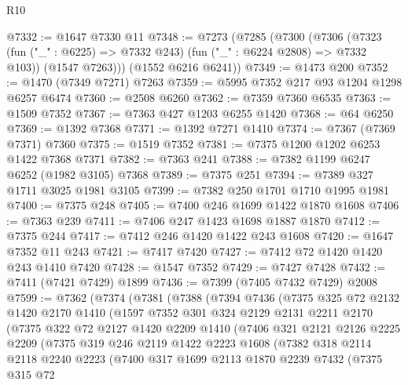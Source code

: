 \begin{lexlean}{R10}
\begin{coremodule}
@7332 := @1647 @7330 @11
@7348 := @7273
    (@7285
      (@7300
        (@7306
          (@7323 (fun ("_" : @6225) => @7332 @243) (fun ("_" : @6224 @2808) => @7332 @103))
          (@1547 @7263)))
      (@1552 @6216 @6241))
@7349 := @1473 @200
@7352 := @1470 (@7349 @7271) @7263
@7359 := @5995 @7352 @217 @93 @1204 @1298 @6257 @6474
@7360 := @2508 @6260
@7362 := @7359 @7360 @6535
@7363 := @1509 @7352
@7367 := @7363 @427 @1203 @6255 @1420
@7368 := @64 @6250
@7369 := @1392 @7368
@7371 := @1392 @7271 @1410
@7374 := @7367 (@7369 @7371) @7360
@7375 := @1519 @7352
@7381 := @7375 @1200 @1202 @6253 @1422 @7368 @7371
@7382 := @7363 @241
@7388 := @7382 @1199 @6247 @6252 (@1982 @3105) @7368
@7389 := @7375 @251
@7394 := @7389 @327 @1711 @3025 @1981 @3105
@7399 := @7382 @250 @1701 @1710 @1995 @1981
@7400 := @7375 @248
@7405 := @7400 @246 @1699 @1422 @1870 @1608
@7406 := @7363 @239
@7411 := @7406 @247 @1423 @1698 @1887 @1870
@7412 := @7375 @244
@7417 := @7412 @246 @1420 @1422 @243 @1608
@7420 := @1647 @7352 @11 @243
@7421 := @7417 @7420
@7427 := @7412 @72 @1420 @1420 @243 @1410 @7420
@7428 := @1547 @7352
@7429 := @7427 @7428
@7432 := @7411 (@7421 @7429) @1899
@7436 := @7399 (@7405 @7432 @7429) @2008
@7599 := @7362
    (@7374
      (@7381
        (@7388
          (@7394
            @7436
            (@7375
              @325
              @72
              @2132
              @1420
              @2170
              @1410
              (@1597
                @7352
                @301
                @324
                @2129
                @2131
                @2211
                @2170
                (@7375
                  @322
                  @72
                  @2127
                  @1420
                  @2209
                  @1410
                  (@7406
                    @321
                    @2121
                    @2126
                    @2225
                    @2209
                    (@7375
                      @319
                      @246
                      @2119
                      @1422
                      @2223
                      @1608
                      (@7382
                        @318
                        @2114
                        @2118
                        @2240
                        @2223
                        (@7400
                          @317
                          @1699
                          @2113
                          @1870
                          @2239
                          @7432
                          (@7375
                            @315
                            @72

\end{coremodule}
\end{lexlean}
